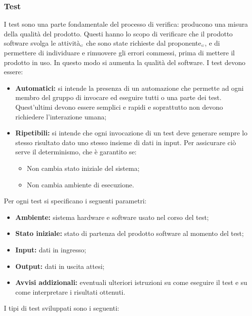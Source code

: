 \subsubsection{Test} \label{ProcessiDiSupportoVerificaAttivitàTest}
I test sono una parte fondamentale del processo di verifica: producono una misura della qualità del prodotto. Questi hanno lo scopo di verificare che il prodotto software svolga le attività$_{\scaleto{G}{3pt}}$ che sono state richieste dal proponente$_{\scaleto{G}{3pt}}$, e di permettere di individuare e rimuovere gli errori  commessi, prima di mettere il prodotto in uso. In questo modo si aumenta la qualità del software.
I test devono essere:
\begin{itemize}
	\item \textbf{Automatici:} si intende la presenza di un automazione che permette ad ogni membro del gruppo di invocare ed eseguire tutti o una parte dei test. Quest’ultimi devono essere semplici e rapidi e soprattutto non devono richiedere l’interazione umana;
	\item \textbf{Ripetibili:} si intende che ogni invocazione di un test deve generare sempre lo stesso risultato dato uno stesso insieme di dati in input. Per assicurare ciò serve il determinismo, che è garantito se:
	\begin{itemize}
		\item Non cambia stato iniziale del sistema;
		\item Non cambia ambiente di esecuzione.
	\end{itemize}
\end{itemize}
Per ogni test si specificano i seguenti parametri:
\begin{itemize}
	\item \textbf{Ambiente:} sistema hardware e software usato nel corso del test;
	\item \textbf{Stato iniziale:} stato di partenza del prodotto software al momento del test;
	\item \textbf{Input:} dati in ingresso;
	\item \textbf{Output:} dati in uscita attesi;
	\item \textbf{Avvisi addizionali:} eventuali ulteriori istruzioni su come eseguire il test e su come interpretare i risultati ottenuti.
\end{itemize}
I tipi di test sviluppati sono i seguenti:
